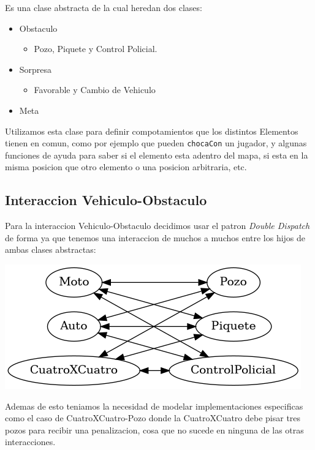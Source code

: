 \documentclass[titlepage,a4paper]{article}
\begin{document}
Es una clase abstracta de la cual heredan dos clases:

\begin{itemize}
\item Obstaculo
\begin{itemize}
\item Pozo, Piquete y Control Policial.
\end{itemize}
\item Sorpresa
\begin{itemize}
\item Favorable y Cambio de Vehiculo
\end{itemize}
\item Meta
\end{itemize}

Utilizamos esta clase para definir compotamientos que los distintos
Elementos tienen en comun, como por ejemplo que pueden \texttt{chocaCon} un
jugador, y algunas funciones de ayuda para saber si el elemento esta
adentro del mapa, si esta en la misma posicion que otro elemento o una
posicion arbitraria, etc.

\subsection{Interaccion Vehiculo-Obstaculo}
\label{sec:org458b237}

Para la interaccion Vehiculo-Obstaculo decidimos usar el patron \emph{Double
Dispatch} de forma ya que tenemos una interaccion de muchos a muchos entre los
hijos de ambas clases abstractas:

\begin{center}
\includegraphics[width=.9\linewidth]{diagramas/interaccionVehiculoObstaculo.png}
\end{center}

Ademas de esto teniamos la necesidad de modelar implementaciones especificas
como el caso de CuatroXCuatro-Pozo donde la CuatroXCuatro debe pisar tres pozos
para recibir una penalizacion, cosa que no sucede en ninguna de las otras interacciones.
\end{document}
